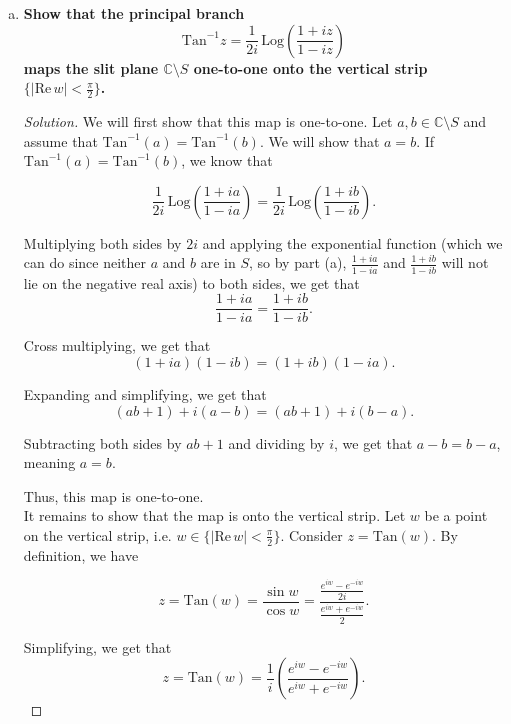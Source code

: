 \documentclass[11pt]{article}
\newcommand{\C}{\mathbb{C}}
\newenvironment{solution}
  {\renewcommand\qedsymbol{$\blacksquare$}\begin{proof}[Solution]}
  {\end{proof}}
\theoremstyle{definition}
\begin{document}
\begin{enumerate}[a)]
\begin{solution}
Thus, if $z \in S$, then $\frac{1+iz}{1-iz}$ must lie on the negative real axis $(-\infty, 0).$ \\

Since we have proved both directions of the if and only if, we can conclude that $\frac{1+iz}{1-iz}$ lies on the negative real axis $(-\infty, 0)$ if and only if $z \in S$. \end{solution}


\item \textbf{Show that the principal branch 
\[ \mathrm{Tan}^{-1} z = \frac{1}{2i} \, \mathrm{Log} \left( \frac{1+iz}{1-iz} \right) \]
maps the slit plane $\C \setminus S$ one-to-one onto the vertical strip $\{ | \mathrm{Re} \, w | < \frac{\pi}{2}\}$.}

\begin{solution}
We will first show that this map is one-to-one. Let $a, b \in \C \setminus S$ and assume that $\mathrm{Tan}^{-1}(a) = \mathrm{Tan}^{-1}(b)$. We will show that $a = b$. If $\mathrm{Tan}^{-1}(a) = \mathrm{Tan}^{-1}(b)$, we know that

\[\frac{1}{2i} \, \mathrm{Log} \left( \frac{1+ia}{1-ia} \right) = \frac{1}{2i} \, \mathrm{Log} \left( \frac{1+ib}{1-ib} \right). \]

Multiplying both sides by $2i$ and applying the exponential function (which we can do since neither $a$ and $b$ are in $S$, so by part (a), $\frac{1+ia}{1-ia}$ and $\frac{1+ib}{1-ib}$ will not lie on the negative real axis) to both sides, we get that
\[ \frac{1+ia}{1-ia} = \frac{1+ib}{1-ib}.\]

Cross multiplying, we get that \[ (1+ia)(1-ib) = (1+ib)(1-ia). \]

Expanding and simplifying, we get that
\[ (ab + 1) + i(a-b) = (ab + 1) + i(b-a). \]

Subtracting both sides by $ab+1$ and dividing by $i$, we get that $a-b = b-a$, meaning $a = b$.

Thus, this map is one-to-one. \\

It remains to show that the map is onto the vertical strip. Let $w$ be a point on the vertical strip, i.e. $w \in \{ | \mathrm{Re} \, w | < \frac{\pi}{2}\}$. Consider $z = \mathrm{Tan}(w)$. By definition, we have

\[ z = \mathrm{Tan}(w) = \frac{\sin w}{\cos w} = \frac{\frac{e^{iw} - e^{-iw}}{2i}}{\frac{e^{iw} + e^{-iw}}{2}}. \]

Simplifying, we get that
\[ z = \mathrm{Tan}(w) = \frac{1}{i} \left( \frac{e^{iw} - e^{-iw}}{e^{iw} + e^{-iw}}\right). \]


\end{solution}
\end{enumerate}
\end{document}
